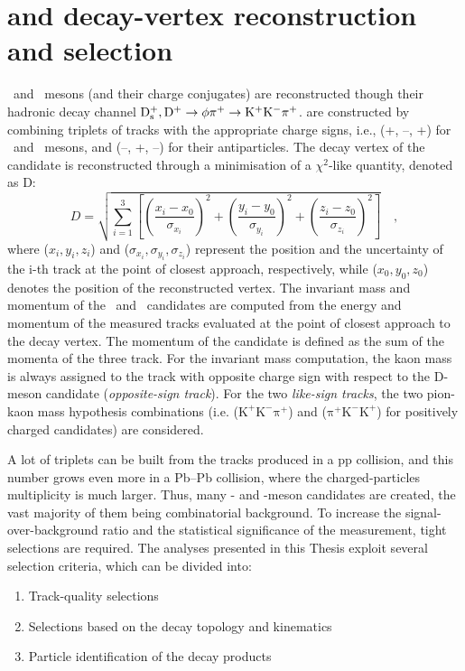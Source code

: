 \section{\ds and \dpl decay-vertex reconstruction and selection}
\ds\ and \dpl\ mesons (and their charge conjugates) are reconstructed though their hadronic decay channel $\mathrm{D_s^+}, \mathrm{D^+} \rightarrow \mathrm{\phi\pi^+ \rightarrow K^+K^-\pi^+}$. are constructed by combining triplets of tracks with the appropriate charge signs, i.e., (+, --, +) for \ds\ and \dpl\ mesons, and (--, +, --) for their antiparticles. The decay vertex of the candidate is reconstructed through a minimisation of a $\chi^2$-like quantity, denoted as D:
\begin{equation}
    D = \sqrt{\sum_{i=1}^3 \left[\left(\frac{x_i-x_0}{\sigma_{x_i}}\right)^2 + \left(\frac{y_i-y_0}{\sigma_{y_i}}\right)^2 +\left(\frac{z_i-z_0}{\sigma_{z_i}}\right)^2\right]}\quad ,
\end{equation}
where ($x_i,y_i,z_i$) and ($\sigma_{x_i},\sigma_{y_i},\sigma_{z_i}$) represent the position and the uncertainty of the i-th track at the point of closest approach, respectively, while ($x_0,y_0,z_0$) denotes the position of the reconstructed vertex. The invariant mass and momentum of the \ds\ and \dpl\ candidates are computed from the energy and momentum of the measured tracks evaluated at the point of closest approach to the decay vertex. The momentum of the candidate is defined as the sum of the momenta of the three track. For the invariant mass computation, the kaon mass is always assigned to the track with opposite charge sign with respect to the D-meson candidate (\emph{opposite-sign track}). For the two \emph{like-sign tracks}, the two pion-kaon mass hypothesis combinations \big(i.e. ($\mathrm{K^+K^-\pi^+}$) and ($\mathrm{\pi^+K^-K^+}$) for positively charged candidates\big) are considered. 

A lot of triplets can be built from the tracks produced in a pp collision, and this number grows even more in a Pb--Pb collision, where the charged-particles multiplicity is much larger. Thus, many \ds- and \dpl-meson candidates are created, the vast majority of them being combinatorial background. To increase the signal-over-background ratio and the statistical significance of the measurement, tight selections are required. The analyses presented in this Thesis exploit several selection criteria, which can be divided into:
\begin{enumerate}[i]
    \item Track-quality selections
    \item Selections based on the decay topology and kinematics
    \item Particle identification of the decay products
\end{enumerate}

